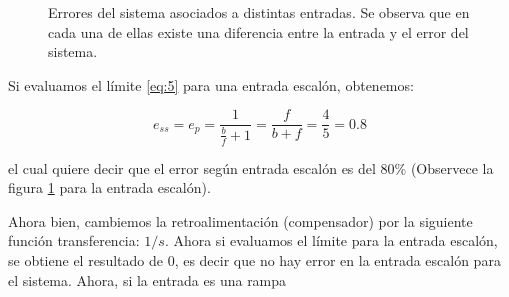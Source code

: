 \begin{figure}[ht!]
    \centering
    \caption{Errores del sistema asociados a distintas entradas. Se observa que en cada una de ellas existe una diferencia entre la entrada y el error del sistema.}
    \label{fig:errores}
\end{figure}


Si evaluamos el límite \ref{eq:5} para una entrada escalón, obtenemos:

\begin{equation}
    e_{ss} = e_p = \frac{1}{\frac{b}{f} + 1} = \frac{f}{b + f} = \frac{4}{5} = 0.8
\end{equation}


\noindent el cual quiere decir que el error según entrada escalón es del $80\%$ (Observece la figura \ref{fig:errores} para la entrada escalón).

Ahora bien, cambiemos la retroalimentación (compensador) por la siguiente función transferencia: $1/s$. Ahora si evaluamos el límite para la entrada escalón, se obtiene el resultado de $0$, es decir que no hay error en la entrada escalón para el sistema. Ahora, si la entrada es una rampa 

